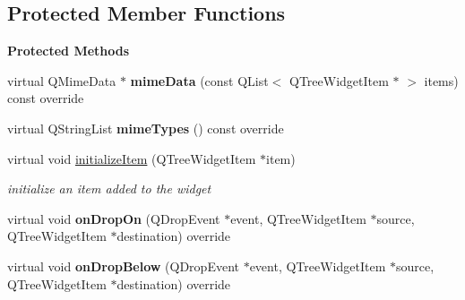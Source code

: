 \subsection*{Protected Member Functions}
\begin{Indent}\textbf{ Protected Methods}\par
\begin{DoxyCompactItemize}
\item 
\mbox{\label{classrev_1_1_view_1_1_scene_tree_widget_a2196310aa247159c4ee80ef4019f4d67}} 
virtual Q\+Mime\+Data $\ast$ {\bfseries mime\+Data} (const Q\+List$<$ Q\+Tree\+Widget\+Item $\ast$ $>$ items) const override
\item 
\mbox{\label{classrev_1_1_view_1_1_scene_tree_widget_a3e76fca87090013b59abedbded50df0a}} 
virtual Q\+String\+List {\bfseries mime\+Types} () const override
\item 
\mbox{\label{classrev_1_1_view_1_1_scene_tree_widget_a138f2dfd9dedbd88a866f71b78eede7a}} 
virtual void \mbox{\hyperlink{classrev_1_1_view_1_1_scene_tree_widget_a138f2dfd9dedbd88a866f71b78eede7a}{initialize\+Item}} (Q\+Tree\+Widget\+Item $\ast$item)
\begin{DoxyCompactList}\small\item\em initialize an item added to the widget \end{DoxyCompactList}\item 
\mbox{\label{classrev_1_1_view_1_1_scene_tree_widget_aebea50c37d9b39321eba6477f895a6a8}} 
virtual void {\bfseries on\+Drop\+On} (Q\+Drop\+Event $\ast$event, Q\+Tree\+Widget\+Item $\ast$source, Q\+Tree\+Widget\+Item $\ast$destination) override
\item 
\mbox{\label{classrev_1_1_view_1_1_scene_tree_widget_a275b464861ac6c41c23e6b1f901afe3f}} 
virtual void {\bfseries on\+Drop\+Below} (Q\+Drop\+Event $\ast$event, Q\+Tree\+Widget\+Item $\ast$source, Q\+Tree\+Widget\+Item $\ast$destination) override
\item 
\mbox{\label{classrev_1_1_view_1_1_scene_tree_widget_acaadcd306b95e0f6a09472b2a195863b}} 

\end{DoxyCompactItemize}
\end{Indent}
